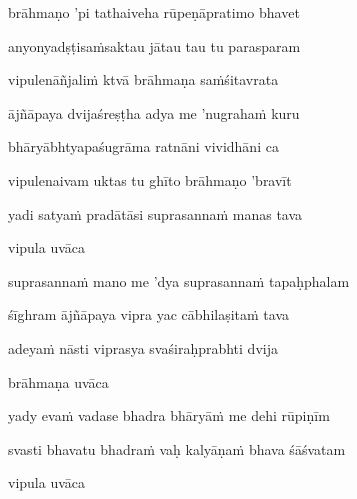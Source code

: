 brāhmaṇo 'pi tathaiveha rūpeṇāpratimo bhavet \veg\dontdisplaylinenum

anyonyadṣṭisa\.msaktau jātau tau tu parasparam\thinspace{\dandab} \dontdisplaylinenum

vipulenāñjali\.m ktvā brāhmaṇa sa\.mśitavrata \veg\dontdisplaylinenum

ājñāpaya dvijaśreṣṭha adya me 'nugraha\.m kuru\thinspace{\dandab} \dontdisplaylinenum

bhāryābhtyapaśugrāma ratnāni vividhāni ca \veg\dontdisplaylinenum

vipulenaivam uktas tu ghīto brāhmaṇo 'bravīt\thinspace{\dandab} \dontdisplaylinenum

yadi satya\.m pradātāsi suprasanna\.m manas tava \veg\dontdisplaylinenum

vipula uvāca~{\dandab}\dontdisplaylinenum 

suprasanna\.m mano me 'dya suprasanna\.m tapaḥphalam\thinspace{\danda} \dontdisplaylinenum

śīghram ājñāpaya vipra yac cābhilaṣita\.m tava \danda\dontdisplaylinenum

adeya\.m nāsti viprasya svaśiraḥprabhti dvija \veg\dontdisplaylinenum

brāhmaṇa uvāca~{\dandab}\dontdisplaylinenum 

yady eva\.m vadase bhadra bhāryā\.m me dehi rūpiṇīm\thinspace{\danda} \dontdisplaylinenum

svasti bhavatu bhadra\.m vaḥ kalyāṇa\.m bhava śāśvatam \veg\dontdisplaylinenum

vipula uvāca~{\dandab}\dontdisplaylinenum 

